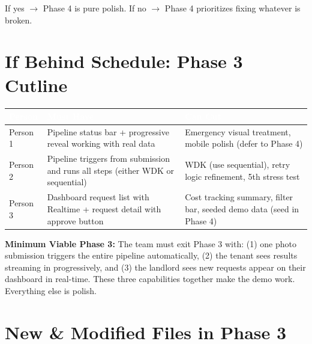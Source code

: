 \documentclass[11pt, a4paper]{article}
\begin{document}
\begin{syncbox}
If yes $\rightarrow$ Phase 4 is pure polish. If no $\rightarrow$ Phase 4 prioritizes fixing whatever is broken.
\end{syncbox}

\vspace{1em}

\section{If Behind Schedule: Phase 3 Cutline}

\begin{tabularx}{\textwidth}{|l|l|X|}
\hline
\rowcolor{primary}
\textcolor{white}{\textbf{Person}} & \textcolor{white}{\textbf{Must Have}} & \textcolor{white}{\textbf{Can Cut}} \\
\hline
Person 1 & Pipeline status bar + progressive reveal working with real data & Emergency visual treatment, mobile polish (defer to Phase 4) \\
\hline
Person 2 & Pipeline triggers from submission and runs all steps (either WDK or sequential) & WDK (use sequential), retry logic refinement, 5th stress test \\
\hline
Person 3 & Dashboard request list with Realtime + request detail with approve button & Cost tracking summary, filter bar, seeded demo data (seed in Phase 4) \\
\hline
\end{tabularx}

\vspace{0.5em}

\begin{successbox}
\textbf{Minimum Viable Phase 3:} The team must exit Phase 3 with: (1) one photo submission triggers the entire pipeline automatically, (2) the tenant sees results streaming in progressively, and (3) the landlord sees new requests appear on their dashboard in real-time. These three capabilities together make the demo work. Everything else is polish.
\end{successbox}

\newpage

\section{New \& Modified Files in Phase 3}
\end{document}
